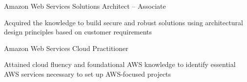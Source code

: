 

\begin{cventries}

 \cventry
    {Amazon Web Services} %
    {Solutions Architect – Associate} %
    {} %
    {} %
    {
      \begin{cvitems} %
        \item {Acquired the knowledge to build secure and robust solutions using architectural design principles based on customer requirements}
      \end{cvitems}
    }

 \cventry
    {Amazon Web Services} %
    {Cloud Practitioner} %
    {} %
    {} %
    {
      \begin{cvitems} %
        \item {Attained cloud fluency and foundational AWS knowledge to identify essential AWS services necessary to set up AWS-focused projects}
      \end{cvitems}
    }

\end{cventries}
